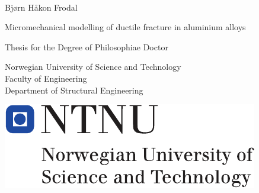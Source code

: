 \frontmatter
\begin{titlingpage}
\pagestyle{empty}
\-
\\

{\huge \color{gray} Bjørn Håkon Frodal}
\vspace{.1\textwidth}

\Huge 
Micromechanical modelling of ductile fracture in aluminium alloys
\vspace{.3\textwidth}

\begin{Spacing}{1.0}
\large
Thesis for the Degree of Philosophiae Doctor \\

\vspace{0.5cm}

Norwegian University of Science and Technology \\
Faculty of Engineering \\
Department of Structural Engineering 
\end{Spacing}
\vfill
\includegraphics[scale=0.7]{Figures/ntnu_logo.pdf}

\end{titlingpage}
\cleardoublepage
